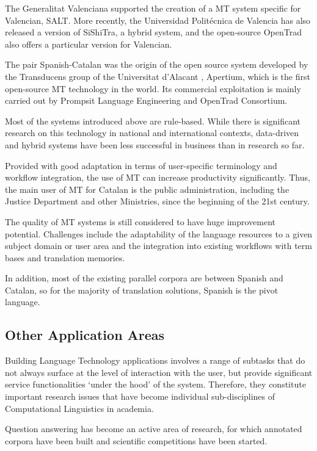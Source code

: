 \documentclass[]{../../metanetpaper}
\begin{document}
\begin{multicols}{2}
The Generalitat Valenciana supported the creation of a MT system specific for Valencian, SALT. More recently, the Universidad Politécnica de Valencia has also released a version of SiShiTra, a hybrid system, and the open-source OpenTrad also offers a particular version for Valencian.

The pair Spanish-Catalan was the origin of the open source system developed by the Transducens \cite{CAT-transducens} group of the Universitat d'Alacant \cite{CAT-UnivAlacant}, Apertium, which is the first open-source MT technology in the world. Its commercial exploitation is mainly carried out by Prompsit Language Engineering and OpenTrad Consortium. 

Most of the systems introduced above are rule-based. While there is significant research on this technology in national and international contexts, data-driven and hybrid systems have been less successful in business than in research so far. 

Provided with good adaptation in terms of user-specific terminology and workflow integration, the use of MT can increase productivity significantly. Thus, the main user of MT for Catalan is the public administration, including the Justice Department and other Ministries, since the beginning of the 21st century. 

The quality of MT systems is still considered to have huge improvement potential. Challenges include the adaptability of the language resources to a given subject domain or user area and the integration into existing workflows with term bases and translation memories.

In addition, most of the existing parallel corpora are between Spanish and Catalan, so for the majority of translation solutions, Spanish is the pivot language.

\subsection{Other Application Areas}

Building Language Technology applications involves a range of subtasks that do not always surface at the level of interaction with the user, but provide significant service functionalities ‘under the hood’ of the system. Therefore, they constitute important research issues that have become individual sub-disciplines of Computational Linguistics in academia. 

Question answering has become an active area of research, for which annotated corpora have been built and scientific competitions have been started.


\end{multicols}
\end{document}
